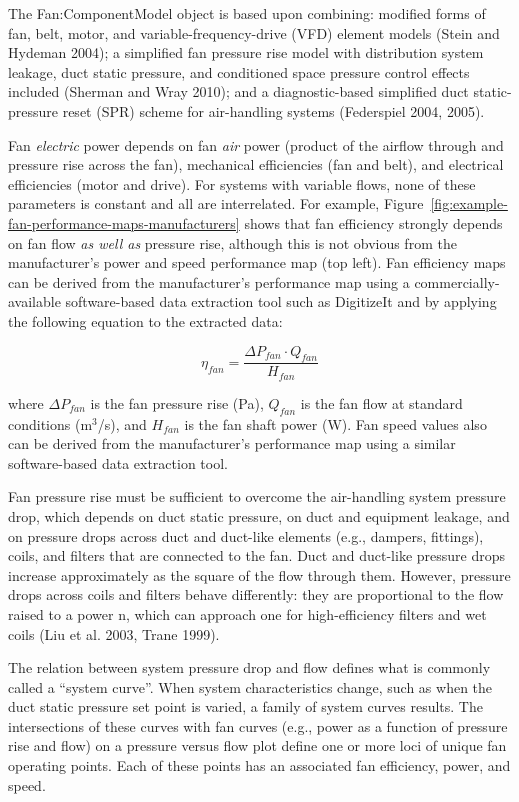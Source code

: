 The Fan:ComponentModel object is based upon combining: modified forms of fan, belt, motor, and variable-frequency-drive (VFD) element models (Stein and Hydeman 2004); a simplified fan pressure rise model with distribution system leakage, duct static pressure, and conditioned space pressure control effects included (Sherman and Wray 2010); and a diagnostic-based simplified duct static-pressure reset (SPR) scheme for air-handling systems (Federspiel 2004, 2005).

Fan \emph{electric} power depends on fan \emph{air} power (product of the airflow through and pressure rise across the fan), mechanical efficiencies (fan and belt), and electrical efficiencies (motor and drive). For systems with variable flows, none of these parameters is constant and all are interrelated. For example, Figure~\ref{fig:example-fan-performance-maps-manufacturers} shows that fan efficiency strongly depends on fan flow \emph{as well as} pressure rise, although this is not obvious from the manufacturer's power and speed performance map (top left). Fan efficiency maps can be derived from the manufacturer's performance map using a commercially-available software-based data extraction tool such as DigitizeIt and by applying the following equation to the extracted data:

\begin{equation}
{\eta_{fan}} = \frac{{\Delta {P_{fan}} \cdot {Q_{fan}}}}{{{H_{fan}}}}
\end{equation}

where \(\Delta P_{fan}\) is the fan pressure rise (Pa), \(Q_{fan}\) is the fan flow at standard conditions (m\(^{3}\)/s), and \(H_{fan}\) is the fan shaft power (W). Fan speed values also can be derived from the manufacturer's performance map using a similar software-based data extraction tool.

Fan pressure rise must be sufficient to overcome the air-handling system pressure drop, which depends on duct static pressure, on duct and equipment leakage, and on pressure drops across duct and duct-like elements (e.g., dampers, fittings), coils, and filters that are connected to the fan. Duct and duct-like pressure drops increase approximately as the square of the flow through them. However, pressure drops across coils and filters behave differently: they are proportional to the flow raised to a power n, which can approach one for high-efficiency filters and wet coils (Liu et al. 2003, Trane 1999).

The relation between system pressure drop and flow defines what is commonly called a ``system curve''. When system characteristics change, such as when the duct static pressure set point is varied, a family of system curves results. The intersections of these curves with fan curves (e.g., power as a function of pressure rise and flow) on a pressure versus flow plot define one or more loci of unique fan operating points. Each of these points has an associated fan efficiency, power, and speed.

